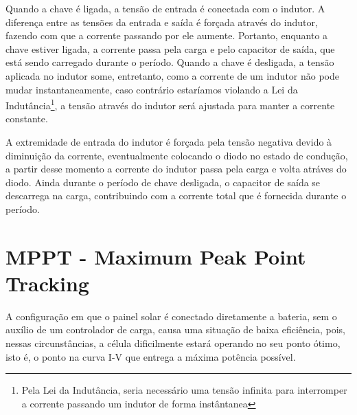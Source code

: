 \noindent
\begin{minipage}{\linewidth}
\label{buck_topology_sample}
\end{minipage}

Quando a chave é ligada, a tensão de entrada é conectada com o indutor. A diferença entre as tensões da entrada e saída é forçada através do indutor, fazendo com que a corrente passando por ele aumente. Portanto, enquanto a chave estiver ligada, a corrente passa pela carga e pelo capacitor de saída, que está sendo carregado durante o período. Quando a chave é desligada, a tensão aplicada no indutor some, entretanto, como a corrente de um indutor não pode mudar instantaneamente, caso contrário estaríamos violando a Lei da Indutância\footnote{Pela Lei da Indutância, seria necessário uma tensão infinita para interromper a corrente passando um indutor de forma instântanea}, a tensão através do indutor será ajustada para manter a corrente constante.

A extremidade de entrada do indutor é forçada pela tensão negativa devido à diminuição da corrente, eventualmente colocando o diodo no estado de condução, a partir desse momento a corrente do indutor passa pela carga e volta atráves do diodo. Ainda durante o período de chave desligada, o capacitor de saída se descarrega na carga, contribuindo com a corrente total que é fornecida durante o período. 


\section{MPPT - Maximum Peak Point Tracking}\label{mppt_revision}
A configuração em que o painel solar é conectado diretamente a bateria, sem o auxílio de um controlador de carga, causa uma situação de baixa eficiência, pois, nessas circunstâncias, a célula dificilmente estará operando no seu ponto ótimo, isto é, o ponto na curva I-V que entrega a máxima potência possível.

